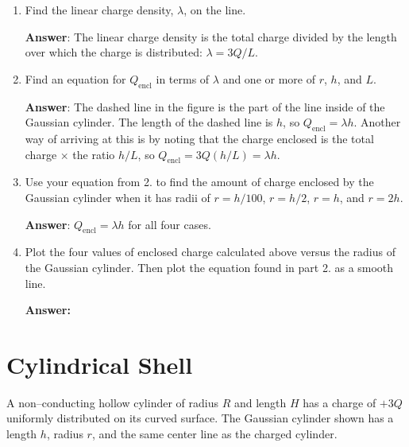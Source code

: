 \documentclass{article}
\begin{document}
\begin{enumerate}

  \item Find the linear charge density, $\lambda$, on the line.

        \ifsolutions
          \textbf{Answer}: The linear charge density is the total charge divided by the length over which the charge is distributed: $\lambda={3Q}/{L}$.
        \else
          \vskip 36.135pt
        \fi

  \item Find an equation for $Q_{\text{encl}}$ in terms of $\lambda$ and one or more of $r$, $h$, and $L$.

        \ifsolutions
          \textbf{Answer}: The dashed line in the figure is the part of the line inside of the Gaussian cylinder. The length of the dashed line is $h$, so $Q_{\text{encl}}=\lambda h$. Another way of arriving at this is by noting that the charge enclosed is the total charge $\times$ the ratio $h/L$, so $Q_{\text{encl}}=3Q(h/L) = \lambda h$.
        \else
          \vskip 36.135pt
        \fi

  \item Use your equation from 2. to find the amount of charge enclosed by the Gaussian cylinder when it has radii of $r=h/100$, $r=h/2$, $r=h$, and $r=2h$.

        \ifsolutions
          \textbf{Answer}: $Q_{\text{encl}}=\lambda h$ for all four cases.
        \else
          \vskip 36.135pt
        \fi

  \item Plot the four values of enclosed charge calculated above versus the radius of the Gaussian cylinder. Then plot the equation found in part 2. as a smooth line.

        \ifsolutions
          \textbf{Answer:}
        
          
        \else
          \newpage
        \fi

\end{enumerate}

\section{Cylindrical Shell}

A non--conducting hollow cylinder of radius $R$ and length $H$ has a charge of $+3Q$ uniformly distributed on its curved surface. The Gaussian cylinder shown has a length $h$, radius $r$, and the same center line as the charged cylinder.
\end{document}
